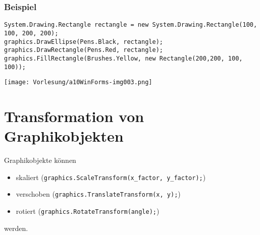 \subsubsection*{Beispiel}
\begin{lstlisting}[language={[Sharp]C}]
System.Drawing.Rectangle rectangle = new System.Drawing.Rectangle(100, 100, 200, 200);
graphics.DrawEllipse(Pens.Black, rectangle);
graphics.DrawRectangle(Pens.Red, rectangle);
graphics.FillRectangle(Brushes.Yellow, new Rectangle(200,200, 100, 100));
\end{lstlisting}
\begin{center}
\texttt{[image: Vorlesung/a10WinForms-img003.png]}
\end{center} 

\section{Transformation von Graphikobjekten}
Graphikobjekte können
\begin{itemize}
\item skaliert  (\lstinline$graphics.ScaleTransform(x_factor, y_factor);$)
\item verschoben (\lstinline$graphics.TranslateTransform(x, y);$)
\item rotiert  (\lstinline$graphics.RotateTransform(angle);$)
\end{itemize}
werden.
